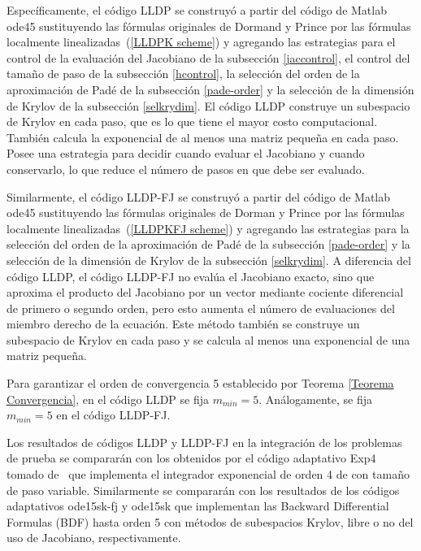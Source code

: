 Específicamente, el c\'odigo LLDP se construy\'o a partir del c\'odigo de Matlab ode45 sustituyendo
las f\'ormulas originales de Dormand y Prince
por las f\'ormulas localmente linealizadas~(\ref{LLDPK scheme}) y agregando las estrategias para
el control de la evaluaci\'on del Jacobiano de la subsecci\'on \ref{jaccontrol}, el control del tama\~no de 
paso de la subsecci\'on 
\ref{hcontrol}, la selecci\'on del orden de la aproximaci\'on de Pad\'e de la subsecci\'on \ref{pade-order} y 
la selecci\'on  de la dimensi\'on de Krylov de la subsecci\'on \ref{selkrydim}.
El c\'odigo LLDP construye un subespacio de Krylov en cada paso, que es lo que tiene el mayor costo computacional.
Tambi\'en calcula la exponencial de al menos una matriz peque\~na en cada paso. Posee una
estrategia para decidir cuando evaluar el Jacobiano y cuando conservarlo, lo que reduce el n\'umero de pasos en que
debe ser evaluado.

Similarmente, el c\'odigo LLDP-FJ se construy\'o a partir del c\'odigo de Matlab ode45 sustituyendo las f\'ormulas originales de Dorman y Prince
por las f\'ormulas localmente linealizadas~(\ref{LLDPKFJ scheme}) y agregando  las estrategias para la selecci\'on del orden de la aproximaci\'on de Pad\'e de la subsecci\'on \ref{pade-order} y la selecci\'on  de la dimensi\'on de Krylov de la subsecci\'on \ref{selkrydim}. A diferencia del código LLDP, el c\'odigo LLDP-FJ no eval\'ua el Jacobiano exacto, sino que aproxima el producto del Jacobiano por un vector mediante cociente diferencial de primero o segundo orden, pero esto aumenta el n\'umero de evaluaciones del miembro derecho de la ecuaci\'on. Este m\'etodo tambi\'en se construye un subespacio de Krylov en cada paso y se calcula al menos una exponencial de una matriz peque\~na. 

Para garantizar el orden de convergencia 5 establecido por Teorema \ref{Teorema Convergencia}, en el código LLDP se fija $m_{min}=5$. Análogamente, se fija $m_{min}=5$ en el código LLDP-FJ. 

Los resultados de códigos LLDP y LLDP-FJ en la integración de los problemas de prueba se compararán con los obtenidos por el c\'odigo adaptativo Exp4 tomado de~\cite{expode} que implementa el integrador exponencial de orden 4 de \cite{hochbruck1998exponential} con tamaño de paso variable. Similarmente se compararán con los resultados de los c\'odigos adaptativos ode15sk-fj y ode15sk que implementan las Backward Differential Formulas (BDF) hasta orden 5 con m\'etodos de subespacios Krylov, libre o no del uso de Jacobiano, respectivamente.

